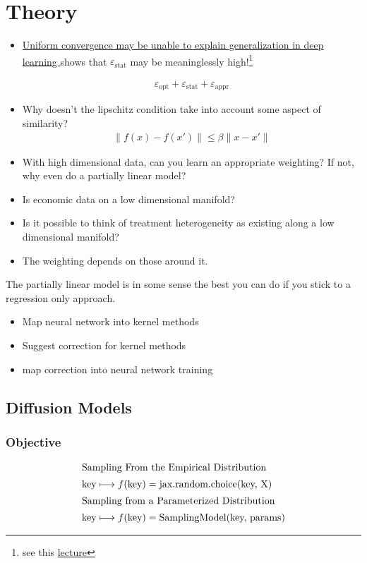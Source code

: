 \documentclass{article}
\begin{document}
\section{Theory}
\begin{itemize}
    \item \href{https://arxiv.org/abs/1902.04742}{Uniform convergence may be unable to explain generalization in deep learning
} shows that $\varepsilon _{\text{stat}}$ may be meaninglessly high!\footnote{see this \href{https://youtu.be/plIJYzVKfdI?list=PLn2-dEmQeTfSLXW8yXP4q_Ii58wFdxb3C&t=1961}{lecture}}

\begin{align*}
\varepsilon _{\text{opt}} + \varepsilon _{\text{stat}} + \varepsilon _{\text{appr}}    
\end{align*}
\item Why doesn't the lipschitz condition take into account some aspect of similarity? 
\begin{align*}
    \| f(x) - f(x') \| \leq \beta \| x- x' \| 
\end{align*}
\end{itemize}
\begin{itemize}
    \item With high dimensional data, can you learn an appropriate weighting? If not, why even do a partially linear model?
    \item Is economic data on a low dimensional manifold? 
    \item Is it possible to think of treatment heterogeneity as existing along a low dimensional manifold?
    \item The weighting depends on those around it. 
\end{itemize}
The partially linear model is in some sense the best you can do if you stick to a regression only approach. 
\begin{itemize}
    \item Map neural network into kernel methods 
    \item Suggest correction for kernel methods 
    \item map correction into neural network training
\end{itemize}
\newpage 
\subsection{Diffusion Models}
\subsubsection{Objective}
\begin{align*}
\intertext{Sampling From the Empirical Distribution}
    &\textrm{key} \longmapsto f(\textrm{key}) = \textrm{jax.random.choice(key, X)} \\ 
\intertext{Sampling from a Parameterized Distribution}
    &\textrm{key} \longmapsto f(\textrm{key}) = \textrm{SamplingModel(key, params)}
\end{align*}
\end{document}
